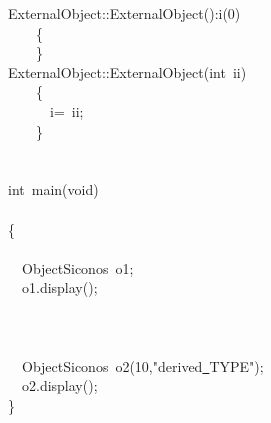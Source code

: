 {ExternalObject::ExternalObject():i(0)\\
\ \ \ \ \{\\
\ \ \ \ \}\\
ExternalObject::ExternalObject(int\ ii)\\
\ \ \ \ \{\\
\ \ \ \ \ \ i=\ ii;\\
\ \ \ \ \}\\
\ \\
\ \\
int\ main(void)\\
\ \\
\{\\
\ \\
\ \ ObjectSiconos\ o1;\\
\ \ o1.display();\\
\ \ \\
\ \\
\ \\
\ \ ObjectSiconos\ o2(10,"{}derived\underline\ TYPE"{});\\
\ \ o2.display();\\
\}\\
\ \\
 }
\normalfont\normalsize

